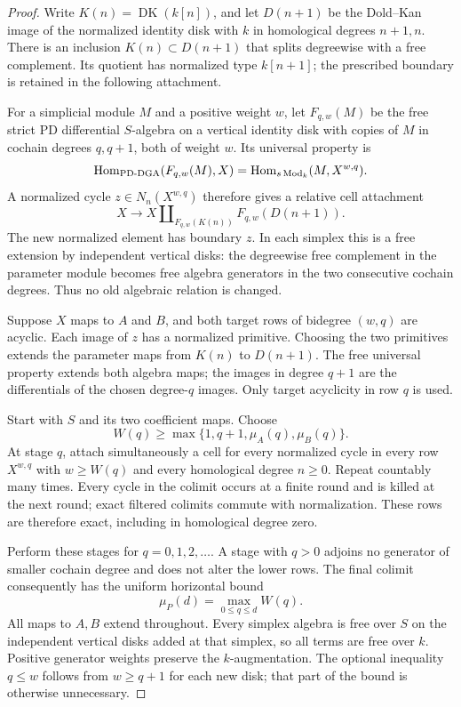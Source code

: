 \begin{proof}
Write $K(n)=\operatorname{DK}(k[n])$, and let $D(n+1)$ be the
Dold--Kan image of the normalized identity disk with $k$ in
homological degrees $n+1,n$. There is an inclusion
$K(n)\subset D(n+1)$ that splits degreewise with a free complement.
Its quotient has normalized type $k[n+1]$; the prescribed boundary
is retained in the following attachment.

For a simplicial module $M$ and a positive weight $w$, let
$F_{q,w}(M)$ be the free strict PD differential $S$-algebra on a
vertical identity disk with copies of $M$ in cochain degrees
$q,q+1$, both of weight $w$. Its universal property is
\[
 \operatorname{Hom}_{\mathrm{PD\text{-}DGA}}(F_{q,w}(M),X)
 =\operatorname{Hom}_{s\operatorname{Mod}_k}(M,X^{w,q}).
\]
A normalized cycle $z\in N_n(X^{w,q})$ therefore gives a
relative cell attachment
\[
 X\longrightarrow
 X\amalg_{F_{q,w}(K(n))}F_{q,w}(D(n+1)).
\]
The new normalized element has boundary $z$. In each simplex this
is a free extension by independent vertical disks: the degreewise
free complement in the parameter module becomes free algebra
generators in the two consecutive cochain degrees. Thus no old
algebraic relation is changed.

Suppose $X$ maps to $A$ and $B$, and both target rows of bidegree
$(w,q)$ are acyclic. Each image of $z$ has a normalized primitive.
Choosing the two primitives extends the parameter maps from $K(n)$
to $D(n+1)$. The free universal property extends both algebra maps;
the images in degree $q+1$ are the differentials of the chosen
degree-$q$ images. Only target acyclicity in row $q$ is used.

Start with $S$ and its two coefficient maps. Choose
\[
 W(q)\geq\max\{1,q+1,\mu_A(q),\mu_B(q)\}.
\]
At stage $q$, attach simultaneously a cell for every normalized
cycle in every row $X^{w,q}$ with $w\geq W(q)$ and every homological
degree $n\geq0$. Repeat countably many times. Every cycle in the
colimit occurs at a finite round and is killed at the next round;
exact filtered colimits commute with normalization. These rows are
therefore exact, including in homological degree zero.

Perform these stages for $q=0,1,2,\ldots$. A stage with $q>0$
adjoins no generator of smaller cochain degree and does not alter
the lower rows. The final colimit consequently has the uniform
horizontal bound
\[
 \mu_P(d)=\max_{0\leq q\leq d}W(q).
\]
All maps to $A,B$ extend throughout. Every simplex algebra is free
over $S$ on the independent vertical disks added at that simplex,
so all terms are free over $k$. Positive generator weights preserve
the $k$-augmentation. The optional inequality $q\leq w$ follows
from $w\geq q+1$ for each new disk; that part of the bound is
otherwise unnecessary.


\end{proof}
